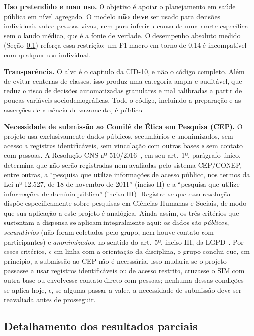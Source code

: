 \documentclass[12pt]{article}
\begin{document}
\textbf{Uso pretendido e mau uso.} O objetivo é apoiar o planejamento em saúde
pública em nível agregado. O modelo \textbf{não deve} ser usado para decisões
individuais sobre pessoas vivas, nem para inferir a causa de uma morte
específica sem o laudo médico, que é a fonte de verdade. O desempenho absoluto
medido (Seção~\ref{sec:desempenho}) reforça essa restrição: um F1-macro em
torno de 0,14 é incompatível com qualquer uso individual.

\textbf{Transparência.} O alvo é o capítulo da CID-10, e não o código
completo. Além de evitar centenas de classes, isso produz uma categoria ampla
e auditável, que reduz o risco de decisões automatizadas granulares e mal
calibradas a partir de poucas variáveis sociodemográficas. Todo o código,
incluindo a preparação e as asserções de ausência de vazamento, é público.

\textbf{Necessidade de submissão ao Comitê de Ética em Pesquisa (CEP).} O
projeto usa exclusivamente dados públicos, secundários e anonimizados, sem
acesso a registros identificáveis, sem vinculação com outras bases e sem
contato com pessoas. A Resolução CNS nº 510/2016~\cite{cns510}, em seu art.~1º,
parágrafo único, determina que não serão registradas nem avaliadas pelo sistema
CEP/CONEP, entre outras, a ``pesquisa que utilize informações de acesso
público, nos termos da Lei nº 12.527, de 18 de novembro de 2011'' (inciso II) e
a ``pesquisa que utilize informações de domínio público'' (inciso III).
Registre-se que essa resolução dispõe especificamente sobre pesquisas em
Ciências Humanas e Sociais, de modo que sua aplicação a este projeto é
analógica. Ainda assim, os três critérios que sustentam a dispensa se aplicam
integralmente aqui: os dados são \emph{públicos}, \emph{secundários} (não
foram coletados pelo grupo, nem houve contato com participantes) e
\emph{anonimizados}, no sentido do art.~5º, inciso III, da
LGPD~\cite{lgpd}. Por esses critérios, e em linha com a orientação da
disciplina, o grupo conclui que, em princípio, a submissão ao CEP não é
necessária. Isso mudaria se o projeto passasse a usar registros
identificáveis ou de acesso restrito, cruzasse o SIM com outra base ou
envolvesse contato direto com pessoas; nenhuma dessas condições se aplica
hoje, e, se alguma passar a valer, a necessidade de submissão deve ser
reavaliada antes de prosseguir.

\subsection{Detalhamento dos resultados parciais}
\label{sec:desempenho}
\end{document}
